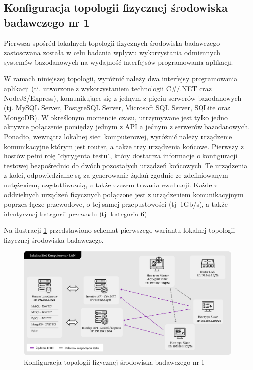 \subsection*{Konfiguracja topologii fizycznej środowiska badawczego nr 1}
\label{sec:lokalne-srodowisko-badawcze-ver-1}
Pierwsza spośród lokalnych topologii fizycznych środowiska badawczego zastosowana została w celu badania wpływu wykorzystania odmiennych systemów bazodanowych na wydajność interfejsów programowania aplikacji.

W ramach niniejszej topologii, wyróżnić należy dwa interfejsy programowania aplikacji (tj. utworzone z wykorzystaniem technologii C\#/.NET oraz NodeJS/Express), komunikujące się z jednym z pięciu serwerów bazodanowych (tj. MySQL Server, PostgreSQL Server, Microsoft SQL Server, SQLite oraz MongoDB). W określonym momencie czasu, utrzymywane jest tylko jedno aktywne połączenie pomiędzy jednym z API a jednym z serwerów bazodanowych. Ponadto, wewnątrz lokalnej sieci komputerowej, wyróżnić należy urządzenie komunikacyjne którym jest router, a także trzy urządzenia końcowe. Pierwszy z hostów pełni rolę "dyrygenta testu", który dostarcza informacje o konfiguracji testowej bezpośrednio do dwóch pozostałych urządzeń końcowych. Te urządzenia z kolei, odpowiedzialne są za generowanie żądań zgodnie ze zdefiniowanym natężeniem, częstotliwością, a także czasem trwania ewaluacji. Każde z oddzielnych urządzeń fizycznych połączone jest z urządzeniem komunikacyjnym poprzez łącze przewodowe, o tej samej przepustowości (tj. 1Gb/s), a także identycznej kategorii przewodu (tj. kategoria 6).

Na ilustracji \ref{fig:topologia-1} przedstawiono schemat pierwszego wariantu lokalnej topologii fizycznej środowiska badawczego.

\begin{figure}[ht]
    \centering
     \includegraphics[width=\linewidth]{rys04/topologia-1.png}
    \caption{Konfiguracja topologii fizycznej środowiska badawczego nr 1}
    \label{fig:topologia-1}
\end{figure}

